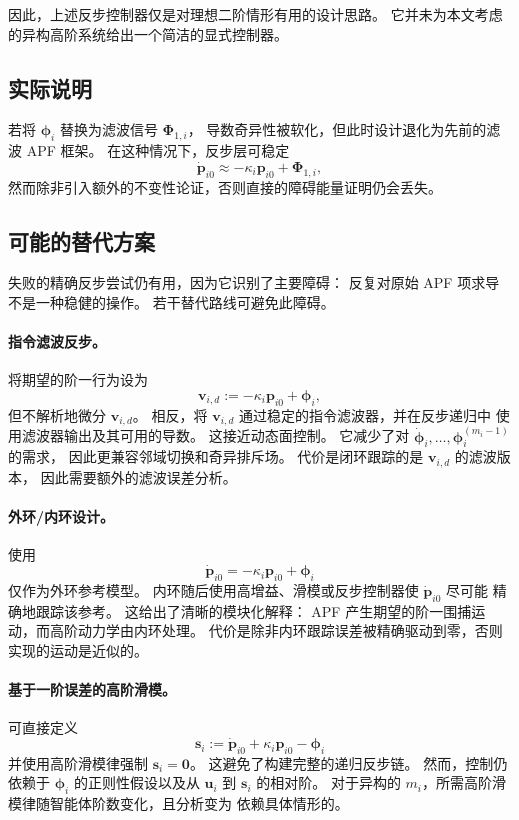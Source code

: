 因此，上述反步控制器仅是对理想二阶情形有用的设计思路。
它并未为本文考虑的异构高阶系统给出一个简洁的显式控制器。

\subsection{实际说明}

若将 $\bm\phi_i$ 替换为滤波信号 $\bm\Phi_{1,i}$，
导数奇异性被软化，但此时设计退化为先前的滤波 APF 框架。
在这种情况下，反步层可稳定
\[
\dot{\bm p}_{i0}\approx -\kappa_i\bm p_{i0}+\bm\Phi_{1,i},
\]
然而除非引入额外的不变性论证，否则直接的障碍能量证明仍会丢失。

\subsection{可能的替代方案}

失败的精确反步尝试仍有用，因为它识别了主要障碍：
反复对原始 APF 项求导不是一种稳健的操作。
若干替代路线可避免此障碍。

\paragraph{指令滤波反步。}
将期望的阶一行为设为
\[
\bm v_{i,d}:=-\kappa_i\bm p_{i0}+\bm\phi_i,
\]
但不解析地微分 $\bm v_{i,d}$。
相反，将 $\bm v_{i,d}$ 通过稳定的指令滤波器，并在反步递归中
使用滤波器输出及其可用的导数。
这接近动态面控制。
它减少了对 $\dot{\bm\phi}_i,\dots,\bm\phi_i^{(m_i-1)}$ 的需求，
因此更兼容邻域切换和奇异排斥场。
代价是闭环跟踪的是 $\bm v_{i,d}$ 的滤波版本，
因此需要额外的滤波误差分析。

\paragraph{外环/内环设计。}
使用
\[
\dot{\bm p}_{i0}= -\kappa_i\bm p_{i0}+\bm\phi_i
\]
仅作为外环参考模型。
内环随后使用高增益、滑模或反步控制器使 $\dot{\bm p}_{i0}$ 尽可能
精确地跟踪该参考。
这给出了清晰的模块化解释：
APF 产生期望的阶一围捕运动，而高阶动力学由内环处理。
代价是除非内环跟踪误差被精确驱动到零，否则实现的运动是近似的。

\paragraph{基于一阶误差的高阶滑模。}
可直接定义
\[
\bm s_i:=\dot{\bm p}_{i0}+\kappa_i\bm p_{i0}-\bm\phi_i
\]
并使用高阶滑模律强制 $\bm s_i=\bm 0$。
这避免了构建完整的递归反步链。
然而，控制仍依赖于 $\bm\phi_i$ 的正则性假设以及从 $\bm u_i$ 到
$\bm s_i$ 的相对阶。
对于异构的 $m_i$，所需高阶滑模律随智能体阶数变化，且分析变为
依赖具体情形的。

